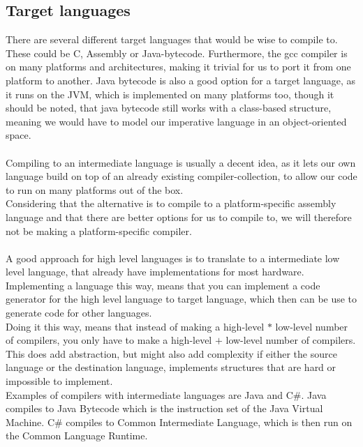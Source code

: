 \subsection{Target languages}\label{CodeGen:TargetLanguage}
There are several different target languages that would be wise to compile to. These could be C, Assembly or Java-bytecode. %
Furthermore, the gcc compiler is on many platforms and architectures, making it trivial for us to port it from one platform to another. Java bytecode is also a good option for a target language, as it runs on the JVM, which is implemented on many platforms too, though it should be noted, that java bytecode still works with a class-based structure, meaning we would have to model our imperative language in an object-oriented space.
\\\\
Compiling to an intermediate language is usually a decent idea, as it lets our own language build on top of an already existing compiler-collection, to allow our code to run on many platforms out of the box.\\
Considering that the alternative is to compile to a platform-specific assembly language and that there are better options for us to compile to, we will therefore not be making a platform-specific compiler.
\\\\
A good approach for high level languages is to translate to a intermediate low level language, that already have implementations for most hardware.\\
Implementing a language this way, means that you can implement a code generator for the high level language to target language, which then can be use to generate code for other languages.\\
Doing it this way, means that instead of making a high-level $*$ low-level number of compilers, you only have to make a high-level $+$ low-level number of compilers.\\
This does add abstraction, but might also add complexity if either the source language or the destination language, implements structures that are hard or impossible to implement.\\
Examples of compilers with intermediate languages are Java and C\#. Java compiles to Java Bytecode which is the instruction set of the Java Virtual Machine. C\# compiles to Common Intermediate Language, which is then run on the Common Language Runtime.

